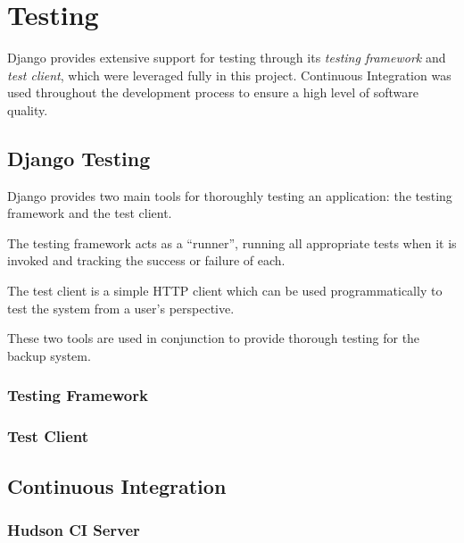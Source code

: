 \chapter{Testing}

Django provides extensive support for testing through its \emph{testing
framework} and \emph{test client}, which were leveraged fully in this project.
Continuous Integration was used throughout the development process to ensure
a high level of software quality.

\section{Django Testing}

Django provides two main tools for thoroughly testing an application: the
testing framework and the test client.

The testing framework acts as a ``runner'', running all appropriate tests when
it is invoked and tracking the success or failure of each.

The test client is a simple HTTP client which can be used programmatically to
test the system from a user's perspective.

These two tools are used in conjunction to provide thorough testing for the
backup system.

\subsection{Testing Framework}

\subsection{Test Client}

\section{Continuous Integration}

\subsection{Hudson CI Server}
